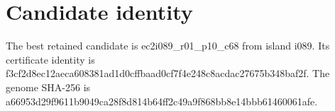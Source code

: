 \section{Candidate identity}The best retained candidate is ec2i089\_r01\_p10\_c68 from island i089. Its certificate identity is f3cf2d8ec12aeca608381ad1d0cffbaad0cf7f4e248c8acdac27675b348baf2f. The genome SHA-256 is a66953d29f9611b9049ca28f8d814b64ff2c49a9f868bb8e14bbb61460061afe.
